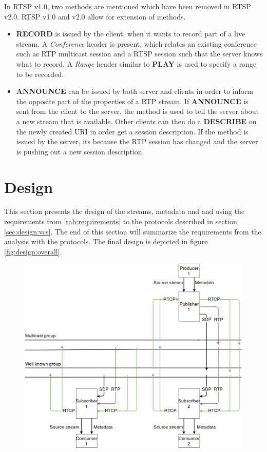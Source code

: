 In RTSP v1.0\citep{RFC2326}, two methods are mentioned which have been removed in RTSP v2.0. RTSP v1.0 and v2.0 allow for extension of methods.
\begin{itemize}
	\item \textbf{RECORD} is issued by the client, when it wants to record part of a live stream. A \textit{Conference} header is present, which relates an existing conference such as RTP multicast session and a RTSP session such that the server knows what to record. A \textit{Range} header similar to \textbf{PLAY} is used to specify a range to be recorded.
	\item \textbf{ANNOUNCE} can be issued by both server and clients in order to inform the opposite part of the properties of a RTP stream. If \textbf{ANNOUNCE} is sent from the client to the server, the method is used to tell the server about a new stream that is available. Other clients can then do a \textbf{DESCRIBE} on the newly created URI in order get a session description. If the method is issued by the server, its because the RTP session has changed and the server is pushing out a new session description.
\end{itemize}


\section{Design}
This section presents the design of the streams, metadata  and  and  using the requirements from \ref{tab:requirements} to the protocols described in section \ref{sec:design:vcs}. The end of this section will summarize the requirements from the analysis with the protocols.
The final design is depicted in figure \ref{fig:design:overall}.
\begin{figure}
	\centering
	\includegraphics[width=\textwidth]{figures/design_overall.png}
\end{figure}


